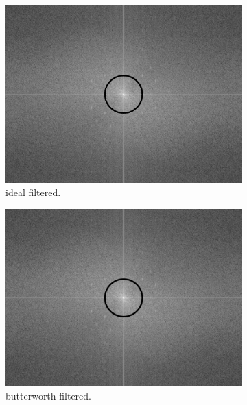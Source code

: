 \documentclass[14pt]{article}
\begin{document}
			\begin{figure}[hbt!]
				\centering
				\begin{subfigure}[b]{0.3\linewidth}
					\includegraphics[width=\linewidth]{ideal_filtered_spec.png}
					\caption{ideal filtered.}
				\end{subfigure}
				\begin{subfigure}[b]{0.3\linewidth}
					\includegraphics[width=\linewidth]{btw_filtered_spec.png}
					\caption{butterworth filtered.}
				\end{subfigure}
				\begin{subfigure}[b]{0.3\linewidth}

\end{subfigure}
\end{figure}
\end{document}
